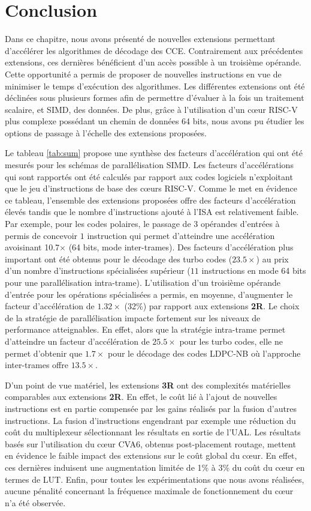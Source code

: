 \documentclass[../main.tex]{subfiles}
\begin{document}
\section{Conclusion}
%
%
%
%
Dans ce chapitre, nous avons présenté de nouvelles extensions permettant d'accélérer les algorithmes de décodage des CCE. 
Contrairement aux précédentes extensions, ces dernières bénéficient d'un accès possible à un troisième opérande. 
Cette opportunité a permis de proposer de nouvelles instructions en vue de minimiser le temps d'exécution des algorithmes. 
Les différentes extensions ont été déclinées sous plusieurs formes afin de permettre d'évaluer à la fois un traitement scalaire, et SIMD, des données. 
De plus, grâce à l'utilisation d'un cœur RISC-V plus complexe possédant un chemin de données 64 bits, nous avons pu étudier les options de passage à l'échelle des extensions proposées.

Le tableau \ref{tab:sum} propose une synthèse des facteurs d'accélération qui ont été mesurés pour les schémas de parallélisation SIMD. 
Les facteurs d'accélérations qui sont rapportés ont été calculés par rapport aux codes logiciels n'exploitant que le jeu d'instructions de base des cœurs RISC-V. 
Comme le met en évidence ce tableau, l'ensemble des extensions proposées offre des facteurs d'accélération élevés tandis que le nombre d'instructions ajouté à l'ISA est relativement faible. 
Par exemple, pour les codes polaires, le passage de $3$ opérandes d'entrées à permis de concevoir $1$ instruction qui permet d'atteindre une accélération avoisinant 10.7$\times$ (64 bits, mode inter-trames). 
Des facteurs d'accélération plus important ont été obtenus pour le décodage des turbo codes ($23.5\times$) au prix d'un nombre d'instructions spécialisées supérieur ($11$ instructions en mode 64 bits pour une parallélisation intra-trame). 
L'utilisation d'un troisième opérande d'entrée pour les opérations spécialisées a permis, en moyenne, d'augmenter le facteur d'accélération de $1.32\times$ (32\%) par rapport aux extensions \textbf{2R}.
Le choix de la stratégie de parallélisation impacte fortement sur les niveaux de performance atteignables. 
En effet, alors que la stratégie intra-trame permet d'atteindre un facteur d'accélération de $25.5\times$ pour les turbo codes, elle ne permet d'obtenir que $1.7\times$ pour le décodage des codes LDPC-NB où l'approche inter-trames offre $13.5\times$.

D'un point de vue matériel, les extensions \textbf{3R} ont des complexités matérielles comparables aux extensions \textbf{2R}.
En effet, le coût lié à l'ajout de nouvelles instructions est en partie compensée par les gains réalisés par la fusion d'autres instructions.
La fusion d'instructions engendrant par exemple une réduction du coût du multiplexeur sélectionnant les résultats en sortie de l'UAL.
Les résultats basés sur l'utilisation du cœur CVA6, obtenus post-placement routage, mettent en évidence le faible impact des extensions sur le coût global du cœur.
En effet, ces dernières induisent une augmentation limitée de 1\% à 3\% du coût du cœur en termes de LUT. 
Enfin, pour toutes les expérimentations que nous avons réalisées, aucune pénalité concernant la fréquence maximale de fonctionnement du cœur n'a été observée.
\end{document}
